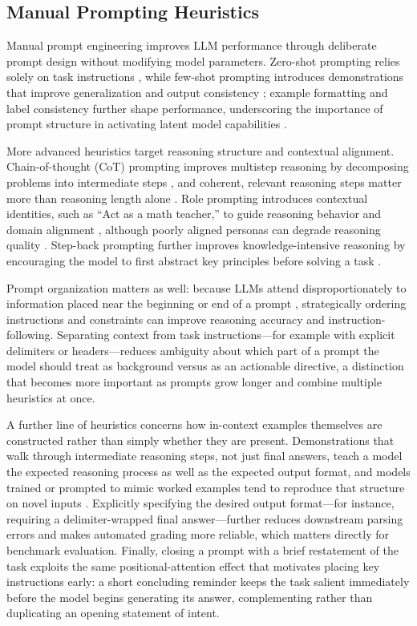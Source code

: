 \documentclass[a4paper,fleqn]{cas-sc}
\begin{document}
\subsection{Manual Prompting Heuristics}

Manual prompt engineering improves LLM performance through deliberate prompt design without modifying model parameters. Zero-shot prompting relies solely on task instructions \citep{brown2020}, while few-shot prompting introduces demonstrations that improve generalization and output consistency \citep{winata2023}; example formatting and label consistency further shape performance, underscoring the importance of prompt structure in activating latent model capabilities \citep{min2022}.

More advanced heuristics target reasoning structure and contextual alignment. Chain-of-thought (CoT) prompting improves multistep reasoning by decomposing problems into intermediate steps \citep{wei2022,kojima2022}, and coherent, relevant reasoning steps matter more than reasoning length alone \citep{wang2024,wang2023}. Role prompting introduces contextual identities, such as ``Act as a math teacher,'' to guide reasoning behavior and domain alignment \citep{wang2024b,kong2024}, although poorly aligned personas can degrade reasoning quality \citep{kim2024}. Step-back prompting further improves knowledge-intensive reasoning by encouraging the model to first abstract key principles before solving a task \citep{zheng2024,codaforno2024}.

Prompt organization matters as well: because LLMs attend disproportionately to information placed near the beginning or end of a prompt \citep{yu2025,liu2024}, strategically ordering instructions and constraints can improve reasoning accuracy and instruction-following. Separating context from task instructions---for example with explicit delimiters or headers---reduces ambiguity about which part of a prompt the model should treat as background versus as an actionable directive, a distinction that becomes more important as prompts grow longer and combine multiple heuristics at once.

A further line of heuristics concerns how in-context examples themselves are constructed rather than simply whether they are present. Demonstrations that walk through intermediate reasoning steps, not just final answers, teach a model the expected reasoning process as well as the expected output format, and models trained or prompted to mimic worked examples tend to reproduce that structure on novel inputs \citep{winata2023,min2022}. Explicitly specifying the desired output format---for instance, requiring a delimiter-wrapped final answer---further reduces downstream parsing errors and makes automated grading more reliable, which matters directly for benchmark evaluation. Finally, closing a prompt with a brief restatement of the task exploits the same positional-attention effect that motivates placing key instructions early: a short concluding reminder keeps the task salient immediately before the model begins generating its answer, complementing rather than duplicating an opening statement of intent.
\end{document}
